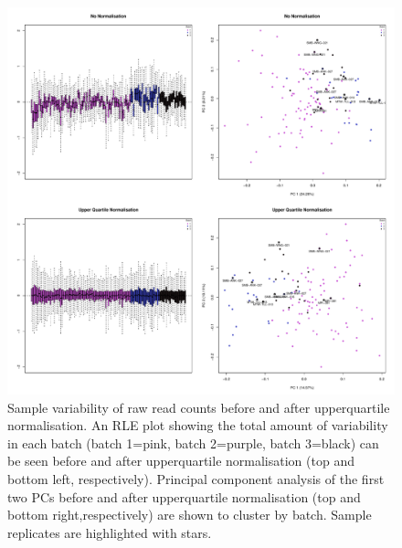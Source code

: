 \documentclass[12pt,a4paper,titlepage,twoside,openright]{book}
\begin{document}
\begin{mainmatter}
{\begin{figure}[htb!]
\centering
\includegraphics[width=\textwidth,height=\textheight,keepaspectratio]{Figures/Normalisation_beforeandAfterUQnorm.pdf}
\caption{Sample variability of raw read counts before and after upperquartile normalisation. An RLE plot showing the total amount of variability in each batch (batch 1=pink, batch 2=purple, batch 3=black) can be seen before and after upperquartile normalisation (top and bottom left, respectively). Principal component analysis of the first two PCs before and after upperquartile normalisation (top and bottom right,respectively) are shown to cluster by batch. Sample replicates are highlighted with stars.}
\label{fig:UQ normalisation}
\end{figure}

}
\end{mainmatter}
\end{document}
